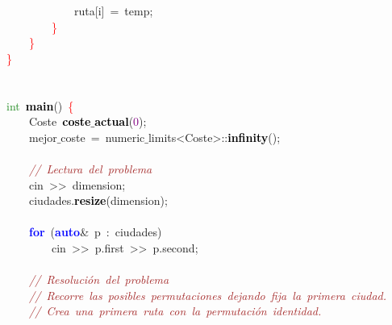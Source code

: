 \mbox{}\ \ \ \ \ \ \ \ \ \ \ \ ruta\textcolor{BrickRed}{[}i\textcolor{BrickRed}{]}\ \textcolor{BrickRed}{=}\ temp\textcolor{BrickRed}{;} \\
\mbox{}\ \ \ \ \ \ \ \ \textcolor{Red}{\}} \\
\mbox{}\ \ \ \ \textcolor{Red}{\}} \\
\mbox{}\textcolor{Red}{\}} \\
\mbox{} \\
\mbox{} \\
\mbox{}\textcolor{ForestGreen}{int}\ \textbf{\textcolor{Black}{main}}\textcolor{BrickRed}{()}\ \textcolor{Red}{\{} \\
\mbox{}\ \ \ \ \textcolor{TealBlue}{Coste}\ \textbf{\textcolor{Black}{coste$\_$actual}}\textcolor{BrickRed}{(}\textcolor{Purple}{0}\textcolor{BrickRed}{);} \\
\mbox{}\ \ \ \ mejor$\_$coste\ \textcolor{BrickRed}{=}\ numeric$\_$limits\textcolor{BrickRed}{\textless{}}Coste\textcolor{BrickRed}{\textgreater{}::}\textbf{\textcolor{Black}{infinity}}\textcolor{BrickRed}{();} \\
\mbox{}\ \ \ \  \\
\mbox{}\ \ \ \ \textit{\textcolor{Brown}{//\ Lectura\ del\ problema}} \\
\mbox{}\ \ \ \ cin\ \textcolor{BrickRed}{\textgreater{}\textgreater{}}\ dimension\textcolor{BrickRed}{;} \\
\mbox{}\ \ \ \ ciudades\textcolor{BrickRed}{.}\textbf{\textcolor{Black}{resize}}\textcolor{BrickRed}{(}dimension\textcolor{BrickRed}{);} \\
\mbox{}\ \ \ \  \\
\mbox{}\ \ \ \ \textbf{\textcolor{Blue}{for}}\ \textcolor{BrickRed}{(}\textbf{\textcolor{Blue}{auto}}\textcolor{BrickRed}{\&}\ p\ \textcolor{BrickRed}{:}\ ciudades\textcolor{BrickRed}{)} \\
\mbox{}\ \ \ \ \ \ \ \ cin\ \textcolor{BrickRed}{\textgreater{}\textgreater{}}\ p\textcolor{BrickRed}{.}first\ \textcolor{BrickRed}{\textgreater{}\textgreater{}}\ p\textcolor{BrickRed}{.}second\textcolor{BrickRed}{;} \\
\mbox{}\ \ \ \  \\
\mbox{}\ \ \ \ \textit{\textcolor{Brown}{//\ Resolución\ del\ problema}} \\
\mbox{}\ \ \ \ \textit{\textcolor{Brown}{//\ Recorre\ las\ posibles\ permutaciones\ dejando\ fija\ la\ primera\ ciudad.}} \\
\mbox{}\ \ \ \ \textit{\textcolor{Brown}{//\ Crea\ una\ primera\ ruta\ con\ la\ permutación\ identidad.}} \\
